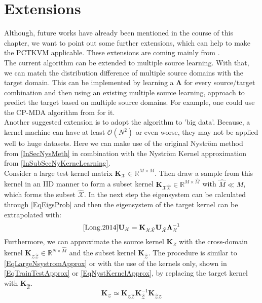 \section{Extensions}\label{InSubSecFExt}
Although, future works have already been mentioned in the course of this chapter, we want to point out some further extensions, which can help to make the \acs{PCTKVM} applicable.
These extensions are coming mainly from \cite{Long.2015}.\\
The current algorithm can be extended to multiple source learning.
With that, we can match the distribution difference of multiple source domains with the target domain.
This can be implemented by learning a $\mathbf{\Lambda}$ for every source/target combination and then using an existing multiple source learning, approach to predict the target based on multiple source domains.
For example, one could use the \ac{CP-MDA} algorithm from \cite{Chattopadhyay.2012} for it.\\
Another suggested extension is to adopt the algorithm to 'big data'.
Because, a kernel machine can have at least $\mathcal{O}(N^2)$ or even worse, they may not be applied well to huge datasets.
Here we can make use of the original Nyström method from \ref{InSecNysMeth} in combination with the Nyström Kernel approximation from \ref{InSubSecNyKerneLearning}.\cite{Long.2015}\\
Consider a large test kernel matrix $\mathbf{K}_\mathcal{X} \in \mathbb{R}^{M\times M}$.
Then draw a sample from this kernel in an \acs{IID} manner to form a subset kernel $\mathbf{K}_\mathcal{X\hat{X}} \in \mathbb{R}^{M\times \hat{M}}$ with $\hat{M} \ll M$, which forms the subset $\mathcal{\hat{X}}$.
In the next step the eigensystem can be calculated through \eqref{EqEigsProb} and then the eigensystem of the target kernel can be extrapolated with:
\begin{equation}\label{EqLargeNsystromApprox}\cite{Long.2014}
\mathbf{U}_\mathcal{X}=\mathbf{K}_\mathcal{X\hat{X}}\mathbf{U}_\mathcal{\hat{X}}\mathbf{\Lambda}_\mathcal{X}^{-1}
\end{equation}
Furthermore, we can approximate the source kernel $\mathbf{K}_{Z}$ with the  cross-domain kernel $\mathbf{K}_{\mathcal{Z\hat{Z}}} \in \mathbb{R}^{N\times \hat{M}}$ and the subset kernel $\mathbf{K}_\mathcal{\hat{Z}}$.
The procedure is similar to \eqref{EqLargeNsystromApprox} or with the use of the kernels only, shown in \eqref{EqTrainTestApprox} or \eqref{EqNystKernelApprox}, by replacing the target kernel with $\mathbf{K}_{\hat{Z}}$.
\begin{equation}
\mathbf{K}_\mathcal{Z} \simeq	\mathbf{K}_{\mathcal{Z\hat{Z}}}\mathbf{K}_\mathcal{\hat{Z}}^{-1}\mathbf{K}_{\mathcal{\hat{Z}Z}}
\end{equation}
